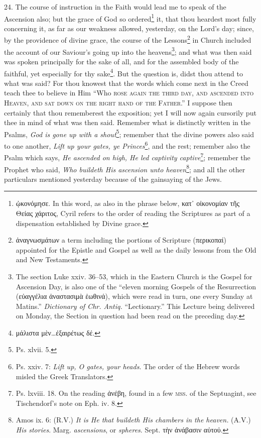 24. The course of instruction in the Faith would lead me to speak of the Ascension also; but the grace of God so ordered\footnote{\textgreek{ᾠκονόμησε}. In this word, as also in the phrase below, \textgreek{κατ᾽ οἰκονομίαν τῆς Θείας χάριτος}, Cyril refers to the order of reading the Scriptures as part of a dispensation established by Divine grace.} it, that thou heardest most fully concerning it, as far as our weakness allowed, yesterday, on the Lord’s day; since, by the providence of divine grace, the course of the Lessons\footnote{\textgreek{ἀναγνωσμάτων} a term including the portions of Scripture (\textgreek{περικοπαί}) appointed for the Epistle and Gospel as well as the daily lessons from the Old and New Testaments.} in Church included the account of our Saviour’s going up into the heavens\footnote{The section Luke xxiv. 36–53, which in the Eastern Church is the Gospel for Ascension Day, is also one of the “eleven morning Gospels of the Resurrection (\textgreek{εὐαγγέλια ἀναστασιμὰ ἑωθινά}), which were read in turn, one every Sunday at Matins.” \emph{Dictionary of Chr. Antiq.} “Lectionary.” This Lecture being delivered on Monday, the Section in question had been read on the preceding day.}; and what was then said was spoken principally for the sake of all, and for the assembled body of the faithful, yet especially for thy sake\footnote{\textgreek{μάλιστα μὲν…ἐξαιρέτως δέ}.}. But the question is, didst thou attend to what was said? For thou knowest that the words which come next in the Creed teach thee to believe in Him “Who \textsc{rose again the third day, and ascended into Heaven, and sat down on the right hand of the Father}.” I suppose then certainly that thou rememberest the exposition; yet I will now again cursorily put thee in mind of what was then said. Remember what is distinctly written in the Psalms, \emph{God is gone up with a shout}\footnote{Ps. xlvii. 5.}; remember that the divine powers also said to one another, \emph{Lift up your gates, ye Princes}\footnote{Ps. xxiv. 7: \emph{Lift up, O gates, your heads}. The order of the Hebrew words misled the Greek Translators.}, and the rest; remember also the Psalm which says, \emph{He ascended on high, He led captivity captive}\footnote{Ps. lxviii. 18. On the reading \textgreek{ἀνέβη}, found in a few \textsc{mss.} of the Septuagint, see Tischendorf’s note on Eph. iv. 8.}; remember the Prophet who said, \emph{Who buildeth His ascension unto heaven}\footnote{Amos ix. 6: (R.V.) \emph{It is He that buildeth His chambers in the heaven.} (A.V.) \emph{His stories}. Marg. \emph{ascensions}, or \emph{spheres}. Sept. \textgreek{τὴν ἀνάβασιν αὐτοὐ}.}; and all the other particulars mentioned yesterday because of the gainsaying of the Jews.

